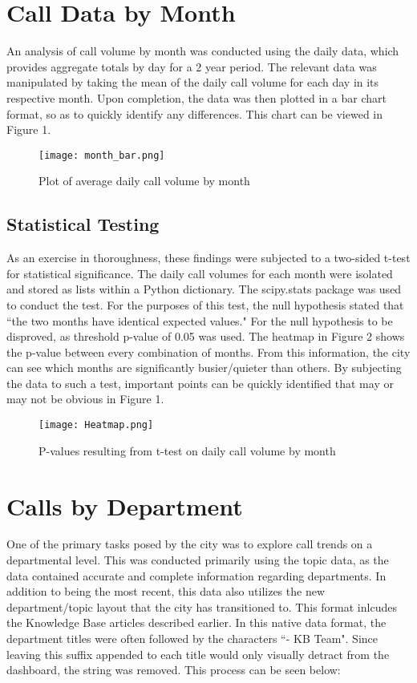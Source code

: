 \documentclass[11pt,twocolumn]{article}
\begin{document}
\section{Call Data by Month}
An analysis of call volume by month was conducted using the daily data, which provides aggregate totals by day for a 2 year period. The relevant data was manipulated by taking the mean of the daily call volume for each day in its respective month.  Upon completion, the data was then plotted in a bar chart format, so as to quickly identify any differences.  This chart can be viewed in Figure 1.

\begin{figure}[h]
  \texttt{[image: month\_bar.png]}
  \caption{Plot of average daily call volume by month}
\end{figure}

\subsection{Statistical Testing}
As an exercise in thoroughness, these findings were subjected to a two-sided t-test for statistical significance.  The daily call volumes for each month were isolated and stored as lists within a Python dictionary.  The scipy.stats package was used to conduct the test.  For the purposes of this test, the null hypothesis stated that ``the two months have identical expected values."  For the null hypothesis to be disproved, as threshold p-value of 0.05 was used.  The heatmap in Figure 2 shows the p-value between every combination of months.  From this information, the city can see which months are significantly busier/quieter than others.  By subjecting the data to such a test, important points can be quickly identified that may or may not be obvious in Figure 1.

\begin{figure}[h]
	\texttt{[image: Heatmap.png]}
	\caption{P-values resulting from t-test on daily call volume by month}
\end{figure}


\section{Calls by Department}
One of the primary tasks posed by the city was to explore call trends on a departmental level.  This was conducted primarily using the topic data, as the data contained accurate and complete information regarding departments.  In addition to being the most recent, this data also utilizes the new department/topic layout that the city has transitioned to.  This format inlcudes the Knowledge Base articles described earlier.  In this native data format, the department titles were often followed by the characters ``- KB Team".  Since leaving this suffix appended to each title would only visually detract from the dashboard, the string was removed.  This process can be seen below:\\
\end{document}
